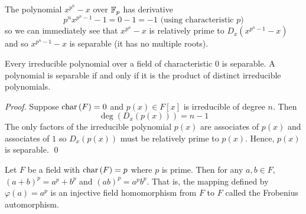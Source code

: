 \begin{example}
    The polynomial $x^{p^n}-x$ over $\mathbb{F}_p$ has derivative 
    $$p^nx^{p^n-1} - 1 = 0 - 1 = -1 \text{ (using characteristic $p$)}$$
    so we can immediately see that $x^{p^n}-x$ is relatively prime to $D_x\left(x^{p^n-1}-x\right)$ and so $x^{p^n-1}-x$ is separable (it has no multiple roots).
\end{example}

\begin{corollary}
    Every irreducible polynomial over a field of characteristic $0$ is separable. A polynomial is separable if and only if it is the product of distinct irreducible polynomials.
\end{corollary}

\begin{proof}
    Suppose $\text{char}\left(F\right) = 0$ and $p(x) \in F[x]$ is irreducible of degree $n$. Then
    $$\deg \left(D_x\left(p(x)\right)\right) = n-1$$
    The only factors of the irreducible polynomial $p(x)$ are associates of $p(x)$ and associates of $1$ so $D_x(p(x))$ must be relatively prime to $p(x)$. Hence, $p(x)$ is separable.
    \qed
\end{proof}

\begin{proposition}
    Let $F$ be a field with $\text{char}\left(F\right) = p$ where $p$ is prime. Then for any $a,b \in F,$ $(a+b)^p = a^p+b^p$ and $(ab)^p = a^pb^p$. That is, the mapping defined by $\varphi(a) = a^p$ is an injective field homomorphism from $F$ to $F$ called the Frobenius automorphism.
\end{proposition}

